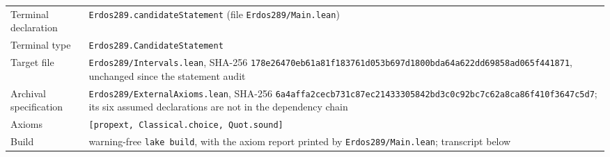 \documentclass[11pt,letterpaper]{article}
\numberwithin{equation}{section}
\theoremstyle{plain}
\theoremstyle{remark}
\begin{document}
\begin{center}
\begin{tabular}{@{}>{\raggedright\arraybackslash}p{3.4cm}>{\raggedright\arraybackslash}p{12.4cm}@{}}
Terminal declaration & \texttt{Erdos289.candidateStatement} (file \texttt{Erdos289/Main.lean})\\
Terminal type & \texttt{Erdos289.CandidateStatement}\\
Target file & \texttt{Erdos289/Intervals.lean}, SHA-256 \texttt{178e26470eb61a81f183761d053b697d1800bda64a622dd69858ad065f441871}, unchanged since the statement audit\\
Archival specification & \texttt{Erdos289/ExternalAxioms.lean}, SHA-256 \texttt{6a4affa2cecb731c87ec21433305842bd3c0c92bc7c62a8ca86f410f3647c5d7}; its six assumed declarations are not in the dependency chain\\
Axioms & \texttt{[propext, Classical.choice, Quot.sound]}\\
Build & warning-free \texttt{lake build}, with the axiom report printed by \texttt{Erdos289/Main.lean}; transcript below\\
\bottomrule
\end{tabular}
\end{center}
\end{document}
